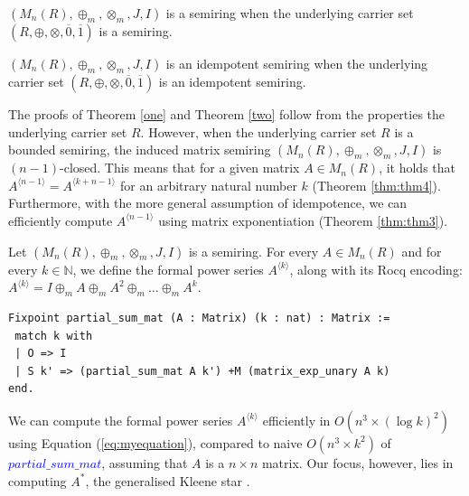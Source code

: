 \documentclass[a4paper,UKenglish,cleveref, autoref, thm-restate, anonymous]{lipics-v2021}
\begin{document}
\begin{theorem}\label{one} 
    \((M_{n}(R),  \oplus_{m}, \otimes_{m}, J, I)\) is a semiring when 
    the underlying carrier set 
    \((R, \oplus, \otimes, \overline{0}, \overline{1})\) is a 
    semiring.
\end{theorem}



\begin{theorem}\label{two}
    \((M_{n}(R),  \oplus_{m}, \otimes_{m}, J, I)\) is an idempotent 
    semiring when the underlying carrier set \((R, \oplus, \otimes, \overline{0}, \overline{1})\) is an idempotent semiring.
\end{theorem}

The proofs of Theorem \ref{one} and Theorem \ref{two} follow from the properties the  underlying carrier set $R$. 
However, when the underlying carrier set \(R\) is a bounded semiring, the induced matrix semiring \((M_{n}(R), \oplus_{m}, \otimes_{m}, J, I)\) is \((n-1)\)-closed. This means that for a given matrix \(A \in M_{n}(R)\), it holds that \(A^{\langle n - 1 \rangle} = A^{\langle k + n - 1 \rangle}\) for an arbitrary natural number \(k\) (Theorem \ref{thm:thm4}). Furthermore, with the more general assumption of idempotence, we can efficiently compute \(A^{\langle n - 1 \rangle}\) using matrix exponentiation (Theorem \ref{thm:thm3}).







\begin{definition}
   Let   \((M_{n}(R),  \oplus_{m}, \otimes_{m}, J, I)\) is a semiring.
   For every $A \in M_{n}(R)$ and for every $k \in \mathbb{N}$, we define the formal power series $A^{\langle k \rangle}$, 
   along with its Rocq encoding: $A^{\langle k \rangle} = I \oplus_{m} A \oplus_{m} A^2 \oplus_{m} \ldots \oplus_{m} A^k$.
\end{definition}
\begin{lstlisting}[language=Coq]
Fixpoint partial_sum_mat (A : Matrix) (k : nat) : Matrix := 
 match k with
 | O => I 
 | S k' => (partial_sum_mat A k') +M (matrix_exp_unary A k)
end.
\end{lstlisting}



We can compute the formal power series $A^{\langle k \rangle}$  efficiently in 
$O(n^3 \times (\log{}k)^2)$ using Equation (\ref{eq:myequation}), compared to naive $O(n^3 \times k^2)$ of \textcolor{blue}{$partial\_sum\_mat$}, assuming that $A$ is a  $n \times n$ matrix.
Our focus, however, lies in computing $A^{*}$, the 
generalised Kleene star \cite{Droste2009}. 
\end{document}
